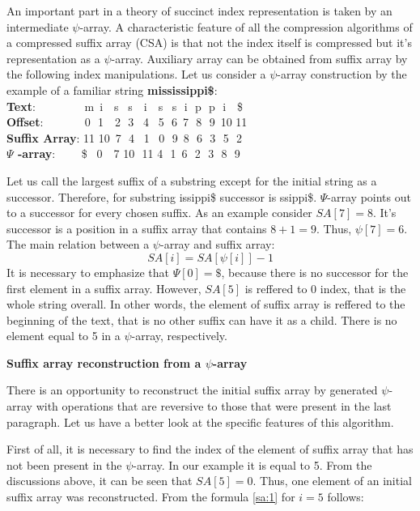 An important part in a theory of succinct index representation is taken by an intermediate $\psi$-array.
A characteristic feature of all the compression algorithms of a compressed suffix array (CSA) is 
that not the index itself is compressed but it's representation as a $\psi$-array.
Auxiliary array can be obtained from suffix array by the following index manipulations.
Let us consider a $\psi$-array construction by the example of a familiar string \textbf{mississippi\$}:
\\ \textbf{Text}:\,\,\,\,\,\,\,\,\,\,\,\,\,\,\,\,\,\,\,\,\,\,\,\, m \,i \,\,\,\,s \,\,\,s \,\,\,\,i \,\,\,\,s \,\,\,s \,\,i \,\,p \,\,p \,\,i \,\,\,\,\$
\\ \textbf{Offset}:\,\,\,\,\,\,\,\,\,\,\,\,\,\,\,\,\,\,\,\, 0 \,\,1 \,\,\,\,2 \,\,3 \,\,\,4 \,\,\,5 \,\,6 \,7 \,\,8 \,\,9 \,10 11
\\ \textbf{Suffix Array}:   11 10 \,7 \,\,4 \,\,\,1 \,\,\,0 \,\,9 \,8 \,\,6 \,\,3 \,\,5 \,\,2
\\ \textbf{$\Psi$ -array}: \,\,\,\,\,\,\,\,\,\,\,\,\$ \,\,\,0 \,\,\,\,7 10 \,\,11 4 \,\,1 \,6 \,\,2 \,\,3 \,\,8 \,\,9

Let us call the largest suffix of a substring except for the initial string as a successor.
Therefore, for substring issippi\$ successor is ssippi\$.
$\Psi$-array points out to a successor for every chosen suffix.
As an example consider $SA[7] = 8$. It's successor is a position in a suffix array that contains $8 + 1 = 9$.
Thus, $\psi[7] = 6$. The main relation between a $\psi$-array and suffix array:
\begin{equation}\label{sa:1}
SA[i] = SA[\psi[i]] - 1
\end{equation}
It is necessary to emphasize that $\Psi[0] = \$$, because there is no successor for the first element in a suffix array.
However, $SA[5]$ is reffered to 0 index, that is the whole string overall.
In other words, the element of suffix array is reffered to the beginning of the text,
that is no other suffix can have it as a child.
There is no element equal to 5 in a $\psi$-array, respectively.

\textbf{Suffix array reconstruction from a $\psi$-array}

There is an opportunity to reconstruct the initial suffix array by generated $\psi$-array
with operations that are reversive to those that were present in the last paragraph.
Let us have a better look at the specific features of this algorithm.

First of all, it is necessary to find the index of the element of suffix array that has not been present in the $\psi$-array.
In our example it is equal to 5. From the discussions above, it can be seen that $SA[5] = 0$.
Thus, one element of an initial suffix array was reconstructed. From the formula \ref{sa:1} for $i = 5$ follows:

